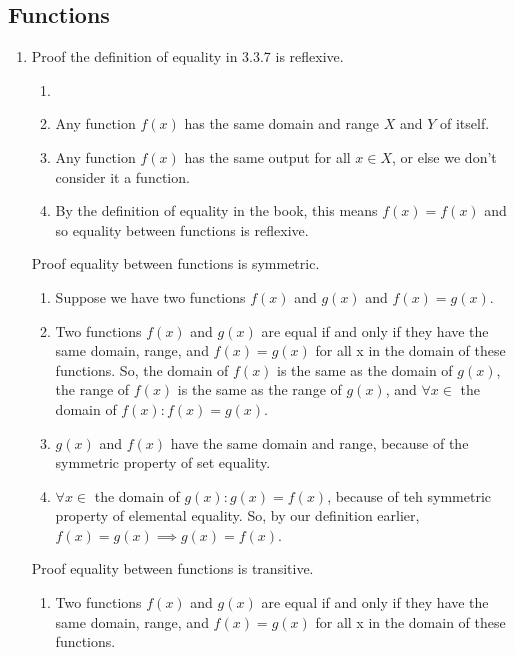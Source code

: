 \documentclass{article}
\begin{document}
    \subsection{Functions}
    \begin{enumerate}
        \item Proof the definition of equality in 3.3.7 is reflexive.
            \begin{enumerate}
                \item
                \item Any function $f(x)$ has the same domain and range $X$ and $Y$ of itself.
                \item Any function $f(x)$ has the same output for all $x \in X$, or else we don't consider it a function.
                \item By the definition of equality in the book, this means $f(x) = f(x)$ and so equality between functions is reflexive.
            \end{enumerate}
            Proof equality between functions is symmetric.
            \begin{enumerate}
                \item Suppose we have two functions $f(x)$ and $g(x)$ and $f(x)=g(x)$.
                \item Two functions $f(x)$ and $g(x)$ are equal if and only if
                    they have the same domain, range, and $f(x) = g(x)$ for all
                    x in the domain of these functions. So, the domain of $f(x)$ is
                    the same as the domain of $g(x)$, the range of $f(x)$ is the same
                    as the range of $g(x)$, and $\forall x \in $ the domain of $f(x) : f(x)=g(x)$.
                \item $g(x)$ and $f(x)$ have the same domain and range, because of the 
                    symmetric property of set equality.
                \item $\forall x \in $ the domain of $g(x): g(x) = f(x)$, because of teh symmetric
                    property of elemental equality. So, by our definition earlier, $f(x) = g(x) \implies g(x) = f(x)$.
            \end{enumerate}
            Proof equality between functions is transitive.
            \begin{enumerate}
                \item Two functions $f(x)$ and $g(x)$ are equal if and only if
                    they have the same domain, range, and $f(x) = g(x)$ for all
                    x in the domain of these functions.

\end{enumerate}
\end{enumerate}
\end{document}
